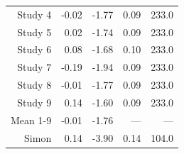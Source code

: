 \begin{table}[!h]
{\begin{tabular}[t]{rrrrr}
\hspace{1em}Study 4 & -0.02 & -1.77 & 0.09 & 233.0\\
\hspace{1em}Study 5 & 0.02 & -1.74 & 0.09 & 233.0\\
\hspace{1em}Study 6 & 0.08 & -1.68 & 0.10 & 233.0\\
\hspace{1em}Study 7 & -0.19 & -1.94 & 0.09 & 233.0\\
\hspace{1em}Study 8 & -0.01 & -1.77 & 0.09 & 233.0\\
\hspace{1em}Study 9 & 0.14 & -1.60 & 0.09 & 233.0\\
\hspace{1em}Mean 1-9 & -0.01 & -1.76 & --- & ---\\
\hspace{1em}Simon & 0.14 & -3.90 & 0.14 & 104.0\\
\bottomrule
\end{tabular}}
\end{table}
